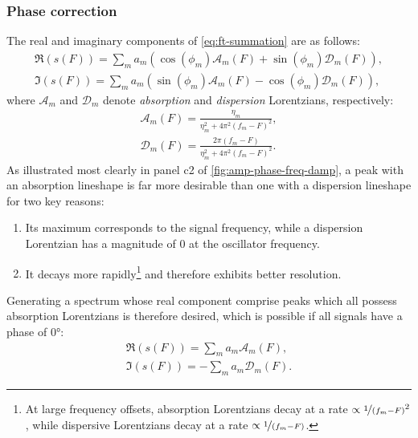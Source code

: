 \subsubsection{Phase correction}
The real and imaginary components of \cref{eq:ft-summation} are as follows:
\begin{subequations}
    \begin{gather}
        \Re(s(F)) = \sum_m
        a_m (\cos(\phi_m) \mathcal{A}_m(F) + \sin(\phi_m) \mathcal{D}_m(F)),\\
        \Im(s(F)) = \sum_m
        a_m (\sin(\phi_m) \mathcal{A}_m(F) - \cos(\phi_m) \mathcal{D}_m(F)),
    \end{gather}
\end{subequations}
where $\mathcal{A}_m$ and  $\mathcal{D}_m$ denote \emph{absorption} and
\emph{dispersion} Lorentzians, respectively:
\begin{subequations}
    \begin{gather}
        \mathcal{A}_m(F) = \frac{\eta_m}{\eta_m^2 + 4 \pi^2 (f_m - F)^2},\\
        \mathcal{D}_m(F) = \frac{2 \pi (f_m - F)}{\eta_m^2 + 4 \pi^2 (f_m - F)^2}.
    \end{gather}
\end{subequations}
As illustrated most clearly in panel c2 of
\cref{fig:amp-phase-freq-damp}, a peak with an absorption lineshape is far more
desirable than one with a dispersion lineshape for two key
reasons:
\begin{enumerate}
    \item Its maximum corresponds to the signal frequency, while a dispersion
        Lorentzian has a magnitude of $0$ at the oscillator frequency.
    \item It decays more rapidly\footnote{
            At large frequency offsets, absorption Lorentzians decay at a rate
            $\propto \nicefrac{1}{(f_m - F)}^2$, while dispersive Lorentzians
            decay at a rate $\propto \nicefrac{1}{(f_m - F)}$.
        } and therefore exhibits better resolution.
\end{enumerate}
Generating a spectrum whose real component comprise peaks which all possess
absorption Lorentzians is therefore desired, which is possible if all signals
have a phase of \ang{0}:
\begin{subequations}
    \begin{gather}
        \Re(s(F)) = \sum_m a_m \mathcal{A}_m(F),\label{eq:absorption}\\
        \Im(s(F)) = -\sum_m a_m \mathcal{D}_m(F).\label{eq:dispersion}
    \end{gather}
\end{subequations}
